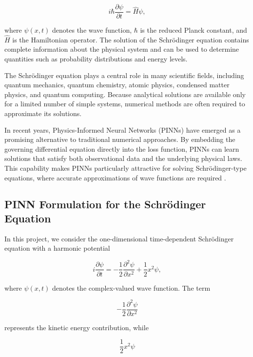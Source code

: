 \documentclass[11pt]{article}
\begin{document}
\begin{equation}
	i\hbar \frac{\partial \psi}{\partial t}
	=
	\hat{H}\psi,
\end{equation}

where $\psi(x,t)$ denotes the wave function, $\hbar$ is the reduced 
Planck constant, and $\hat{H}$ is the Hamiltonian operator. 
The solution of the Schrödinger equation contains complete 
information about the physical system and can be used to 
determine quantities such as probability distributions and energy levels.

The Schrödinger equation plays a central role in many 
scientific fields, including quantum mechanics, 
quantum chemistry, atomic physics, 
condensed matter physics, and quantum computing. 
Because analytical solutions are available only for a 
limited number of simple systems, numerical methods are 
often required to approximate its solutions.

In recent years, Physics-Informed Neural Networks (PINNs) 
have emerged as a promising alternative to traditional numerical 
approaches. By embedding the governing differential 
equation directly into the loss function, PINNs can learn 
solutions that satisfy both observational data and the 
underlying physical laws. This capability makes PINNs particularly
attractive for solving Schrödinger-type equations, where accurate 
approximations of wave functions are required \cite{wangDatadrivenRogueWaves2021}. 

\subsection{PINN Formulation for the Schrödinger Equation}

In this project, we consider the one-dimensional time-dependent 
Schrödinger equation with a harmonic potential

\begin{equation}
	i\frac{\partial \psi}{\partial t}
	=
	-\frac{1}{2}\frac{\partial^2 \psi}{\partial x^2}
	+
	\frac{1}{2}x^2\psi,
\end{equation}

where $\psi(x,t)$ denotes the complex-valued wave function. The term

\begin{equation}
	-\frac{1}{2}\frac{\partial^2 \psi}{\partial x^2}
\end{equation}

represents the kinetic energy contribution, while

\begin{equation}
	\frac{1}{2}x^2\psi
\end{equation}
\end{document}
